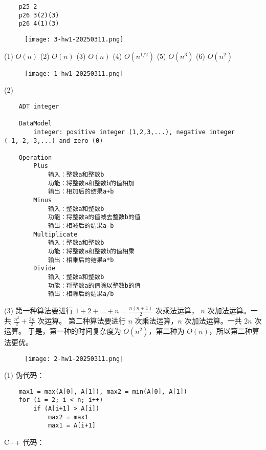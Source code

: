 \begin{lstlisting}
    p25 2
    p26 3(2)(3)
    p26 4(1)(3)
    \end{lstlisting}
\begin{figure}[H]
    \centering
    \texttt{[image: 3-hw1-20250311.png]}
    \label{}
\end{figure}

(1) $O(n)$
(2) $O (n)$
(3) $O(n)$
(4) $O(n^{1/2 })$
(5) $O(n^{3})$
(6) $O(n^{2})$

\begin{figure}[H]
    \centering
    \texttt{[image: 1-hw1-20250311.png]}
    \label{}
\end{figure}

(2)

\begin{lstlisting}
    ADT integer
    
    DataModel
        integer: positive integer (1,2,3,...), negative integer (-1,-2,-3,...) and zero (0)
    
    Operation
        Plus
            输入：整数a和整数b
            功能：将整数a和整数b的值相加
            输出：相加后的结果a+b
        Minus
            输入：整数a和整数b
            功能：将整数a的值减去整数b的值
            输出：相减后的结果a-b
        Multiplicate
            输入：整数a和整数b
            功能：将整数a和整数b的值相乘
            输出：相乘后的结果a*b
        Divide
            输入：整数a和整数b
            功能：将整数a的值除以整数b的值
            输出：相除后的结果a/b
    \end{lstlisting}
(3)
第一种算法要进行 $1+2+\dots+n=\frac{n(n+1)}{2}$ 次乘法运算， $n$ 次加法运算。一共 $\frac{n^{2}}{2}+\frac{3n}{2}$ 次运算。
第二种算法要进行 $n$ 次乘法运算，$n$ 次加法运算。一共 $2n$ 次运算。
于是，第一种的时间复杂度为 $O(n^{2})$，第二种为 $O(n)$，所以第二种算法更优。

\begin{figure}[H]
    \centering
    \texttt{[image: 2-hw1-20250311.png]}
    \label{}
\end{figure}

(1)
伪代码：

\begin{lstlisting}
    max1 = max(A[0], A[1]), max2 = min(A[0], A[1])
    for (i = 2; i < n; i++)
        if (A[i+1] > A[i])
            max2 = max1
            max1 = A[i+1]
    \end{lstlisting}
C++ 代码：


